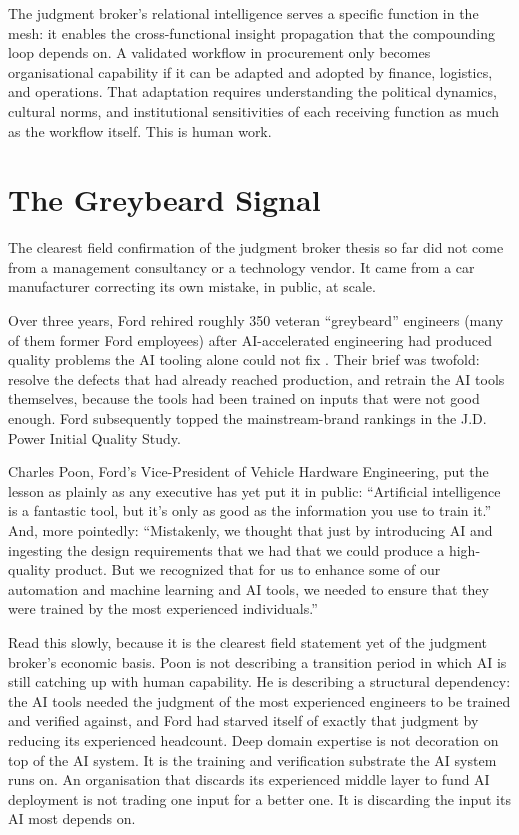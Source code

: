 The judgment broker's relational intelligence serves a specific function in the mesh: it enables the cross-functional insight propagation that the compounding loop depends on. A validated workflow in procurement only becomes organisational capability if it can be adapted and adopted by finance, logistics, and operations. That adaptation requires understanding the political dynamics, cultural norms, and institutional sensitivities of each receiving function as much as the workflow itself. This is human work.

\section{The Greybeard Signal}

The clearest field confirmation of the judgment broker thesis so far did not come from a management consultancy or a technology vendor. It came from a car manufacturer correcting its own mistake, in public, at scale.

Over three years, Ford rehired roughly 350 veteran ``greybeard'' engineers (many of them former Ford employees) after AI-accelerated engineering had produced quality problems the AI tooling alone could not fix \parencite{Bloomberg2026Ford}. Their brief was twofold: resolve the defects that had already reached production, and retrain the AI tools themselves, because the tools had been trained on inputs that were not good enough. Ford subsequently topped the mainstream-brand rankings in the J.D. Power Initial Quality Study.

Charles Poon, Ford's Vice-President of Vehicle Hardware Engineering, put the lesson as plainly as any executive has yet put it in public: ``Artificial intelligence is a fantastic tool, but it's only as good as the information you use to train it.'' And, more pointedly: ``Mistakenly, we thought that just by introducing AI and ingesting the design requirements that we had that we could produce a high-quality product. But we recognized that for us to enhance some of our automation and machine learning and AI tools, we needed to ensure that they were trained by the most experienced individuals.''

Read this slowly, because it is the clearest field statement yet of the judgment broker's economic basis. Poon is not describing a transition period in which AI is still catching up with human capability. He is describing a structural dependency: the AI tools needed the judgment of the most experienced engineers to be trained and verified against, and Ford had starved itself of exactly that judgment by reducing its experienced headcount. Deep domain expertise is not decoration on top of the AI system. It is the training and verification substrate the AI system runs on. An organisation that discards its experienced middle layer to fund AI deployment is not trading one input for a better one. It is discarding the input its AI most depends on.

